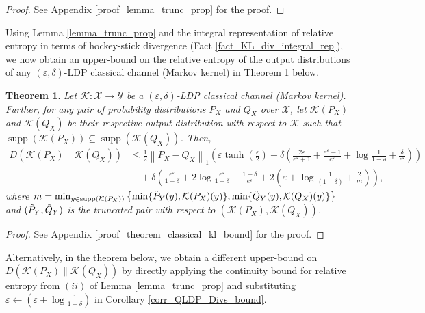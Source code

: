 \documentclass[onecolumn,ldraftcls, 11pt]{IEEEtran}
\newtheorem{theorem}{\bf{Theorem}}
\newcommand{\supp}{\operatorname{supp}}
\newcommand{\nn}{\nonumber}
\newcommand{\eps}{\varepsilon}
\newcommand*{\cK}{\mathcal{K}}
\newcommand*{\cX}{\mathcal{X}}
\newcommand*{\cY}{\mathcal{Y}}
\newcommand{\norm}[2]{{\left\lVert #1 \right\rVert}_{#2}}
\begin{document}
\begin{proof}
    See Appendix \ref{proof_lemma_trunc_prop} for the proof.
\end{proof}


Using Lemma \ref{lemma_trunc_prop} and the integral representation of relative entropy in terms of hockey-stick divergence (Fact \ref{fact_KL_div_integral_rep}), we now obtain an upper-bound on the relative entropy of the output distributions of any $(\eps,\delta)$-LDP classical channel (Markov kernel) in Theorem \ref{theorem_classical_kl_bound} below.

\begin{theorem}\label{theorem_classical_kl_bound}
   Let $\cK : \cX \to \cY$ be a $(\eps,\delta)$-LDP classical channel (Markov kernel). Further, for any pair of probability distributions $P_X$ and $Q_X$ over $\cX$, let $\cK(P_X)$ and $\cK(Q_X)$ be their respective output distribution with respect to $\cK$ such that $\supp(\cK(P_X))\subseteq \supp(\cK(Q_X))$. Then, 
   \begin{align*}
 D(\cK(P_X)\| \cK(Q_X))
    &\leq \frac{1}{2}\norm{P_X -Q_X}{1} \left(\eps \tanh\left(\frac{\eps}{2}\right)+ \delta\left(\frac{2\eps}{e^\eps+1} + \frac{e^\eps-1}{e^\eps} + \log\frac{1}{1-\delta} + \frac{\delta}{e^\eps}\right)\right)\nn\\
    &\quad + \delta \left(\frac{e^\eps}{1-\delta} + 2\log\frac{e^\eps}{1-\delta}  - \frac{1-\delta}{e^\eps} + 2 \left( \eps + \log \frac{1}{(1-\delta)} +  \frac{2}{m} \right)\right),
    \end{align*}
    where $m = \min_{y \in \supp( \cK(P_X) )}
    \left\{\min\{\Tilde{P}_Y(y), \cK(P_X)(y)\},
    \min\{\Tilde{Q}_Y(y), \cK(Q_X)(y)\}\right\}$ 
    and $(\Tilde{P}_Y,\Tilde{Q}_Y)$ is 
the truncated  pair with respect to $(\cK(P_X), \cK(Q_X))$.
\end{theorem}

\begin{proof}
See Appendix \ref{proof_theorem_classical_kl_bound} for the proof.
\end{proof}

Alternatively, in the theorem below, we obtain a different upper-bound on 
$D(\cK(P_X) \| \cK(Q_X))$ by directly applying the continuity bound for relative entropy from $(ii)$ of Lemma \ref{lemma_trunc_prop} and substituting $\eps \leftarrow \left(\eps + \log\frac{1}{1-\delta}\right)$ in Corollary \ref{corr_QLDP_Divs_bound}.
\end{document}
